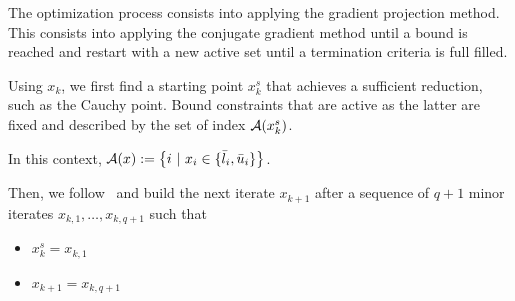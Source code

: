 \documentclass[10pt]{article}
\numberwithin{equation}{section}
\begin{document}
	The optimization process consists into applying the gradient projection method. This consists into applying the conjugate gradient method until a bound is reached and restart with a new active set until a termination criteria is full filled.
	
	Using $x_k$, we first find a starting point $x_k^s$ that achieves a sufficient reduction, such as the Cauchy point. Bound constraints that are active as the latter are fixed and described by the set of index ${\mathcal{A}}(x_k^s)$. 
	
	In this context, ${\mathcal{A}}(x):=\left\{i\ \vert \ x_i \in \{\bar{l}_i,\bar{u}_i\}\right\}$.
	
	Then, we follow~\cite{linmore:1999a} and build the next iterate $x_{k+1}$ after a sequence of $q+1$ minor iterates $x_{k,1},\ldots,x_{k,q+1}$ such that
	\begin{itemize}
		\item $x_{k}^s=x_{k,1}$
		\item $x_{k+1}=x_{k,q+1}$ 
	\end{itemize}
	
	
	\clearpage
	
	
	
\end{document}
